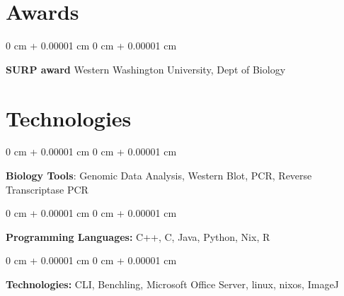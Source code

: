 \documentclass[10pt, letterpaper]{article}
\newenvironment{onecolentry}{
    \begin{adjustwidth}{
        0 cm + 0.00001 cm
    }{
        0 cm + 0.00001 cm
    }
}{
    \end{adjustwidth}
} %
\newenvironment{twocolentry}[2][]{
    \onecolentry
    \def\secondColumn{#2}
    \setcolumnwidth{\fill, 4.5 cm}
    \begin{paracol}{2}
}{
    \switchcolumn \raggedleft \secondColumn
    \end{paracol}
    \endonecolentry
} %
\begin{document}
    \section{Awards}
    \begin{twocolentry}
      {2025}
      \textbf{SURP award} \newline
      Western Washington University, Dept of Biology
    \end{twocolentry}


    \section{Technologies}



        \begin{onecolentry}
            {\textbf{Biology Tools}:} Genomic Data Analysis, Western Blot, PCR, Reverse Transcriptase PCR
        \end{onecolentry}
        \vspace{0.2 cm}
        \begin{onecolentry}
            \textbf{Programming Languages:} C++, C, Java, Python, Nix, R
        \end{onecolentry}

        \vspace{0.2 cm}

        \begin{onecolentry}
            \textbf{Technologies:} CLI, Benchling, Microsoft Office Server, linux, nixos, ImageJ
        \end{onecolentry}
\end{document}
